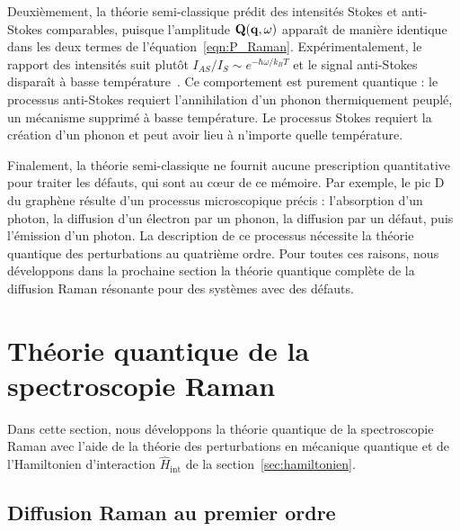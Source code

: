 Deuxièmement, la théorie semi-classique prédit des intensités Stokes et anti-Stokes comparables, puisque l'amplitude $\mathbf{Q}(\mathbf{q},\omega)$ apparaît de manière identique dans les deux termes de l'équation~\eqref{eqn:P_Raman}. Expérimentalement, le rapport des intensités suit plutôt $I_{AS}/I_S\sim e^{-\hbar\omega/k_BT}$ et le signal anti-Stokes disparaît à basse température~\cite{cardonaLightScatteringSolids1982,cardonaLightScatteringSolids1983}. Ce comportement est purement quantique : le processus anti-Stokes requiert l'annihilation d'un phonon thermiquement peuplé, un mécanisme supprimé à basse température. Le processus Stokes requiert la création d'un phonon et peut avoir lieu à n'importe quelle température.

Finalement, la théorie semi-classique ne fournit aucune prescription quantitative pour traiter les défauts, qui sont au c\oe ur de ce mémoire. Par exemple, le pic D du graphène résulte d'un processus microscopique précis : l'absorption d'un photon, la diffusion d'un électron par un phonon, la diffusion par un défaut, puis l'émission d'un photon. La description de ce processus nécessite la théorie quantique des perturbations au quatrième ordre. Pour toutes ces raisons, nous développons dans la prochaine section la théorie quantique complète de la diffusion Raman résonante pour des systèmes avec des défauts.

\section{Théorie quantique de la spectroscopie Raman}\label{sec:raman_quantique}

Dans cette section, nous développons la théorie quantique de la spectroscopie Raman avec l'aide de la théorie des perturbations en mécanique quantique et de l'Hamiltonien d'interaction $\hat{H}_\text{int}$ de la section~\ref{sec:hamiltonien}.

\subsection{Diffusion Raman au premier ordre}\label{sec:Raman_premier_ordre}

